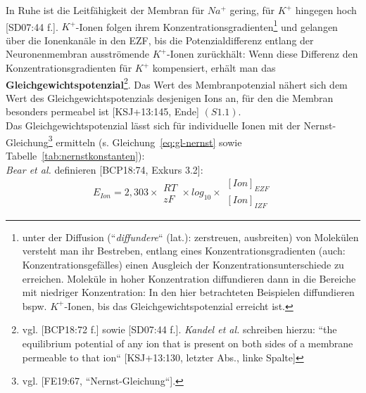 {In Ruhe ist die Leitfähigkeit der Membran für $Na^+$ gering, für $K^+$ hingegen hoch [SD07:44 f.].
$K^+$-Ionen folgen ihrem Konzentrationsgradienten\footnote{
 unter der Diffusion (``\textit{diffundere}`` (lat.): zerstreuen, ausbreiten) von Molekülen versteht man ihr Bestreben, entlang eines Konzentrationsgradienten (auch: Konzentrationsgefälles) einen Ausgleich der Konzentrationsunterschiede zu erreichen. Moleküle in hoher Konzentration diffundieren dann in die Bereiche mit niedriger Konzentration: In den hier betrachteten Beispielen diffundieren bspw. $K^+$-Ionen, bis das Gleichgewichtspotenzial erreicht ist.
} und gelangen über die Ionenkanäle in den EZF, bis die Potenzialdifferenz entlang der Neuronenmembran ausströmende $K^+$-Ionen zurückhält: Wenn diese Differenz den Konzentrationsgradienten für $K^+$ kompensiert, erhält man das \textbf{Gleichgewichtspotenzial}\footnote{
 vgl. {[BCP18:72 f.] sowie [SD07:44 f.]}. \textit{Kandel et al.} schreiben hierzu:
 ``the equilibrium potential of any ion that is present on both sides of a membrane permeable to that ion`` {[KSJ+13:130, letzter Abs., linke Spalte]}
}.
Das Wert des Membranpotenzial nähert sich dem Wert des Gleichgewichtspotenzials desjenigen Ions an, für den die Membran besonders permeabel ist [KSJ+13:145, Ende] $(S1.1)$.\\
Das Gleichgewichtspotenzial lässt sich für individuelle Ionen mit der Nernst-Gleichung\footnote{
 vgl. {[FE19:67, ``Nernst-Gleichung``]}.
} ermitteln (s. Gleichung~\ref{eq:gl-nernst} sowie Tabelle~\ref{tab:nernstkonstanten}):\\

\textit{Bear et al.} definieren [BCP18:74, Exkurs 3.2]:
\begin{equation}
E_{Ion} = 2,303  \times \begin{matrix} RT \\ \hline zF \end{matrix} \times log_{10} \times \begin{matrix} [Ion]_{EZF} \\ \hline [Ion]_{IZF} \end{matrix}
\label{eq:gl-nernst}
\end{equation}



}
